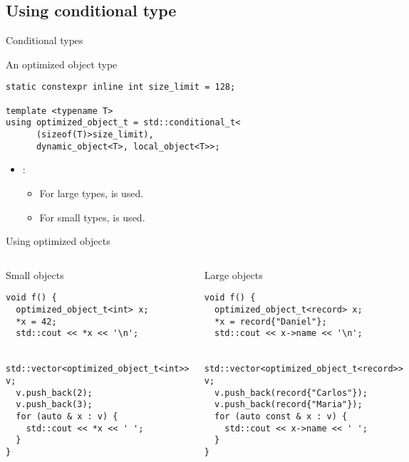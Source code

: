 \subsection{Using conditional type}

\begin{frame}[t,fragile]{Conditional types}
\begin{block}{An optimized object type}
\begin{lstlisting}
static constexpr inline int size_limit = 128;

template <typename T>
using optimized_object_t = std::conditional_t< 
      (sizeof(T)>size_limit),
      dynamic_object<T>, local_object<T>>;
\end{lstlisting}
\end{block}

\begin{itemize}
  \item {}:
    \begin{itemize}
      \item For large types,  is used.
      \item For small types,  is used.
    \end{itemize}
\end{itemize}

\end{frame}


\begin{frame}[t,fragile]{Using optimized objects}
\begin{columns}[T]

\begin{block}{Small objects}
\begin{lstlisting}
void f() {
  optimized_object_t<int> x;
  *x = 42;
  std::cout << *x << '\n';

  std::vector<optimized_object_t<int>> v;
  v.push_back(2);
  v.push_back(3);
  for (auto & x : v) {
    std::cout << *x << ' ';
  }
}
\end{lstlisting}
\end{block}

\begin{block}{Large objects}
\begin{lstlisting}
void f() {
  optimized_object_t<record> x;
  *x = record{"Daniel"};
  std::cout << x->name << '\n';

  std::vector<optimized_object_t<record>> v;
  v.push_back(record{"Carlos"});
  v.push_back(record{"Maria"});
  for (auto const & x : v) {
    std::cout << x->name << ' ';
  }
}
\end{lstlisting}
\end{block}

\end{columns}
\end{frame}
